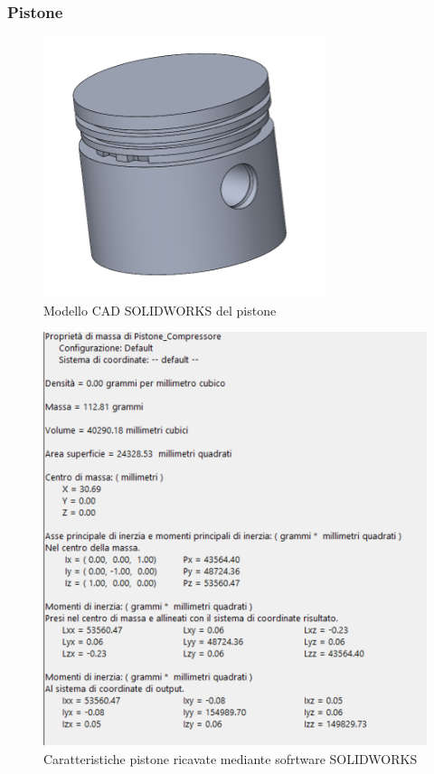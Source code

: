 \subsubsection{Pistone}
\begin{figure}[h]
    \centering
    \includegraphics[scale=0.8]{Immagini/PistoneCAD.png}
    \caption{Modello CAD SOLIDWORKS del pistone}
    \label{fig:PistoneCAD}
\end{figure}
\begin{figure}[h]
    \centering
    \includegraphics[scale=0.47]{Immagini/CaratteristichePistone.png}
    \caption{Caratteristiche pistone ricavate mediante sofrtware SOLIDWORKS}
    \label{fig:Pistone}
\end{figure}
\newpage
